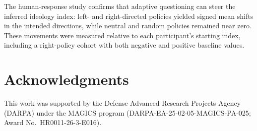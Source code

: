 \documentclass[technote,10pt]{IEEEtran}
\begin{document}
The human-response study confirms that adaptive questioning can steer the inferred ideology index: left- and right-directed policies yielded signed mean shifts in the intended directions, while neutral and random policies remained near zero. These movements were measured relative to each participant's starting index, including a right-policy cohort with both negative and positive baseline values.

\section*{Acknowledgments}
This work was supported by the Defense Advanced Research Projects Agency (DARPA) under the MAGICS program (DARPA-EA-25-02-05-MAGICS-PA-025; Award No.~HR0011-26-3-E016).




\end{document}
